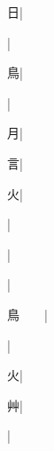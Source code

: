 \begin{multicols}{2}
{{\cjk{}{\cnsym{}　}{\cnsym{}　}日}|{}\par
{}|{}\par
{\cjk{}{\cnsym{}　}{\cnsym{}　}鳥}|{}\par
{}|{}\par
{\cjk{}{\cnsym{}　}{\cnsym{}　}月}|{}\par
{\cjk{}{\cnsym{}　}{\cnsym{}　}言}|{}\par
{\cjk{}{\cnsym{}　}{\cnsym{}　}火}|{}\par
{}|{}\par
{}|{}\par
{}|{}\par
{\cjk{}鳥{\cnsym{}　}{\cnsym{}　}}|{}\par
{\cjk{}{\cnsym{}　}{\cnsym{}　}{\cnsym{}　}}|{}\par
{\cjk{}{\cnsym{}　}{\cnsym{}　}火}|{}\par
{\cjk{}{\cnsym{}　}{\cnsym{}　}艸}|{}\par
{\cjk{}{\cnsym{}　}{\cnsym{}　}{\cnsym{}　}}|{}\par
}
\end{multicols}
